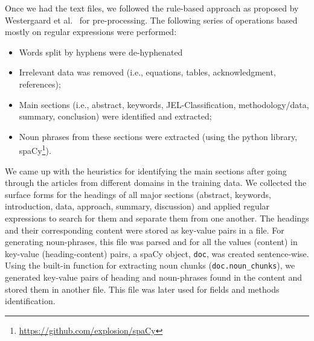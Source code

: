 \documentclass[runningheads]{llncs}
\begin{document}
\smallskip

Once we had the text files, we followed the rule-based approach as proposed by Westergaard et al.~\cite{DBLP:journals/ploscb/WestergaardSTJB18} for pre-processing. The following series of operations based mostly on regular expressions were performed:
\begin{itemize}
    \item Words split by hyphens were de-hyphenated %
    \item Irrelevant data was removed (i.e., equations, tables, acknowledgment, references);
    \item \raggedright Main sections (i.e., abstract, keywords,
    JEL-Classification, methodology/data, summary, conclusion) were identified and extracted;
    \item Noun phrases from these sections were extracted (using the python library, spaCy\footnote{\url{https://github.com/explosion/spaCy}}).
\end{itemize}

We came up with the heuristics for identifying the main sections after going through the articles from different domains in the training data. We collected the surface forms for the headings of all major sections (abstract, keywords, introduction, data, approach, summary, discussion) and applied regular expressions to search for them and separate them from one another. The headings and their corresponding content were stored as key-value pairs in a file. %
For generating noun-phrases, this file was parsed and for all the values (content) in key-value (heading-content) pairs, a spaCy object, \texttt{doc}, was created sentence-wise. Using the built-in function for extracting noun chunks ({\texttt{doc.noun\_chunks}}), we generated key-value pairs of heading and noun-phrases found in the content and stored them in another file. This file was later used for fields and methods identification.
\end{document}
